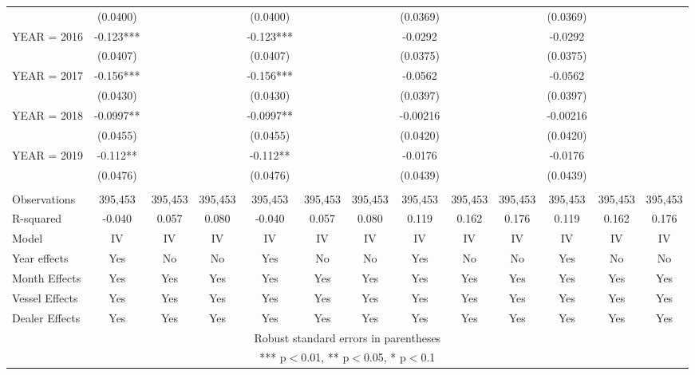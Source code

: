 \begin{tabular}{lcccccccccccc}
 & (0.0400) &  &  & (0.0400) &  &  & (0.0369) &  &  & (0.0369) &  &  \\
YEAR = 2016 & -0.123*** &  &  & -0.123*** &  &  & -0.0292 &  &  & -0.0292 &  &  \\
 & (0.0407) &  &  & (0.0407) &  &  & (0.0375) &  &  & (0.0375) &  &  \\
YEAR = 2017 & -0.156*** &  &  & -0.156*** &  &  & -0.0562 &  &  & -0.0562 &  &  \\
 & (0.0430) &  &  & (0.0430) &  &  & (0.0397) &  &  & (0.0397) &  &  \\
YEAR = 2018 & -0.0997** &  &  & -0.0997** &  &  & -0.00216 &  &  & -0.00216 &  &  \\
 & (0.0455) &  &  & (0.0455) &  &  & (0.0420) &  &  & (0.0420) &  &  \\
YEAR = 2019 & -0.112** &  &  & -0.112** &  &  & -0.0176 &  &  & -0.0176 &  &  \\
 & (0.0476) &  &  & (0.0476) &  &  & (0.0439) &  &  & (0.0439) &  &  \\
 &  &  &  &  &  &  &  &  &  &  &  &  \\
Observations & 395,453 & 395,453 & 395,453 & 395,453 & 395,453 & 395,453 & 395,453 & 395,453 & 395,453 & 395,453 & 395,453 & 395,453 \\
R-squared & -0.040 & 0.057 & 0.080 & -0.040 & 0.057 & 0.080 & 0.119 & 0.162 & 0.176 & 0.119 & 0.162 & 0.176 \\
Model & IV & IV & IV & IV & IV & IV & IV & IV & IV & IV & IV & IV \\
Year effects & Yes & No & No & Yes & No & No & Yes & No & No & Yes & No & No \\
Month Effects & Yes & Yes & Yes & Yes & Yes & Yes & Yes & Yes & Yes & Yes & Yes & Yes \\
Vessel Effects & Yes & Yes & Yes & Yes & Yes & Yes & Yes & Yes & Yes & Yes & Yes & Yes \\
 Dealer Effects & Yes & Yes & Yes & Yes & Yes & Yes & Yes & Yes & Yes & Yes & Yes & Yes \\ \hline
\multicolumn{13}{c}{ Robust standard errors in parentheses} \\
\multicolumn{13}{c}{ *** p$<$0.01, ** p$<$0.05, * p$<$0.1} \\
\end{tabular}
